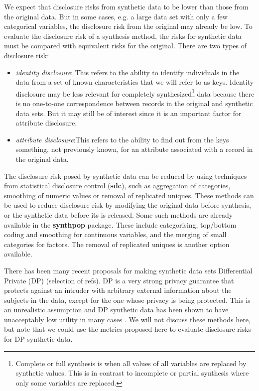 \documentclass[12pt]{article}
\begin{document}
We expect that disclosure risks from synthetic data to be lower than those from the original data. But in some cases, e.g. a large data set with only a few categorical variables, the disclosure risk from the original may already be low. To evaluate the disclosure risk of a synthesis method, the risks for synthetic data must be compared with equivalent risks for the original. There are two types of disclosure risk:

\begin{itemize}
\item{\textit{identity disclosure}: This refers to the ability to identify individuals in the data from a set of known characteristics that  we will refer to as keys. Identity disclosure may be less relevant for completely synthesized\footnote{Complete or full synthesis is when all values of all variables are replaced by synthetic values. This is in contrast to incomplete or partial synthesis where only some variables are replaced.} data because there is no one-to-one correspondence between records in the original and synthetic data sets. But it may still be of interest since it is an important factor for attribute disclosure.}
\item{\textit{attribute disclosure}:This refers to the ability to find out from the keys something, not previously known, for an attribute associated with a record in the original data.}
\end{itemize}

The disclosure risk posed by synthetic data can be reduced by using techniques from statistical disclosure control (\textbf{sdc}), such as aggregation of categories, smoothing of numeric values or removal of replicated uniques. These methods can be used  to reduce  disclosure risk by modifying the original data before synthesis, or the synthetic data before its is released. Some such methods are already available in the \textbf{synthpop} package. These include categorising, top/bottom coding and  smoothing for continuous variables, and the merging of small categories for factors. The removal of replicated uniques is another option available.

There has been many recent proposals for making synthetic data sets Differential Private (DP) (selection of refs). DP is a very strong privacy guarantee that protects against an intruder with arbitrary external information about the subjects in the data, except for the one whose privacy is being protected. This is an unrealistic assumption and DP synthetic data has been shown to have unacceptably low utility in many cases \cite{bowen_ss, groundhog}.  We will not discuss these methods here, but note that we could use the metrics proposed here to evaluate disclosure risks for DP synthetic data. 
\end{document}
